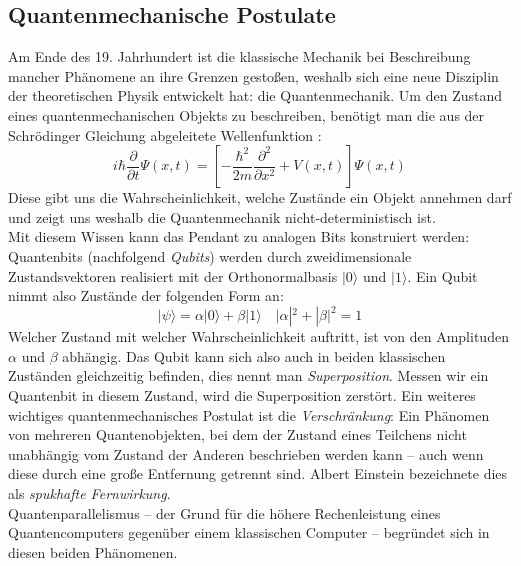 \subsection{Quantenmechanische Postulate}
\label{subsec:qm}
Am Ende des 19. Jahrhundert ist die klassische Mechanik bei Beschreibung mancher Phänomene an ihre Grenzen gestoßen, weshalb sich eine neue Disziplin der theoretischen Physik entwickelt hat: die Quantenmechanik. Um den Zustand eines quantenmechanischen Objekts zu beschreiben, benötigt man die aus der Schrödinger Gleichung abgeleitete Wellenfunktion  \cite{Griffiths1995}:
\begin{equation}
i \hbar \frac{\partial}{\partial t} \Psi(x, t)=\left[-\frac{\hbar^{2}}{2 m} \frac{\partial^{2}}{\partial x^{2}}+V(x, t)\right] \Psi(x, t)
\end{equation}
Diese gibt uns die Wahrscheinlichkeit, welche Zustände ein Objekt annehmen darf und zeigt uns weshalb die Quantenmechanik nicht-deterministisch ist. \\
Mit diesem Wissen kann  das Pendant zu analogen Bits konstruiert werden: Quantenbits (nachfolgend \textit{Qubits}) werden durch zweidimensionale Zustandsvektoren realisiert mit der Orthonormalbasis $|0\rangle$ und $|1\rangle$. Ein Qubit nimmt also Zustände \cite{Homeister2018} der folgenden Form an: 
\begin{equation}
|\psi\rangle=\alpha|0\rangle+\beta|1\rangle \quad|\alpha|^{2}+|\beta|^{2}=1
 \end{equation}
 Welcher Zustand mit welcher Wahrscheinlichkeit auftritt, ist von den Amplituden $\alpha$ und $\beta$ abhängig. Das Qubit kann sich also auch in beiden klassischen Zuständen gleichzeitig befinden, dies nennt man \textit{Superposition}. Messen wir ein Quantenbit in diesem Zustand, wird die Superposition zerstört. Ein weiteres wichtiges quantenmechanisches Postulat ist die \textit{Verschränkung}: Ein Phänomen von mehreren Quantenobjekten, bei dem der Zustand eines Teilchens nicht unabhängig vom Zustand der Anderen beschrieben werden kann -- auch wenn diese durch eine große Entfernung getrennt sind. Albert Einstein bezeichnete dies als \textit{spukhafte Fernwirkung}.\\
Quantenparallelismus -- der Grund für die höhere Rechenleistung eines Quantencomputers gegenüber einem klassischen Computer -- begründet sich in diesen beiden Phänomenen.

